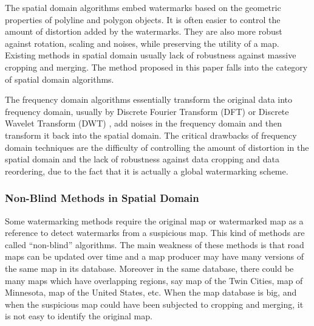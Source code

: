 The spatial domain algorithms embed watermarks based on the geometric properties of 
polyline and polygon objects. It is often easier to control the amount of distortion
added by the watermarks. They are also more robust against rotation, scaling 
and noises, while preserving the utility of a map. 
Existing methods in spatial domain usually lack of robustness against massive cropping and merging. 
The method proposed in this paper falls into the category of spatial domain algorithms. 

The frequency domain algorithms essentially transform the original data into
frequency domain, usually by Discrete Fourier Transform (DFT) 
\cite{Kitamura01:DFT,DFT,Illustration} or Discrete Wavelet Transform (DWT)
\cite{Liyuanyuan03}, add noises in the frequency domain and then transform it
back into the spatial domain.  
The critical drawbacks of frequency domain techniques are the 
difficulty of controlling the amount of distortion in the spatial domain
and the lack of robustness against data cropping and data reordering, due to
the fact that it is actually a global watermarking scheme. 

\subsubsection{Non-Blind Methods in Spatial Domain}
Some watermarking methods \cite{Han06:Adaptive,OhbuchiUE02,OhbuchiUE03} 
require the original map or watermarked map as a reference to detect watermarks 
from a suspicious map. This kind of methods are called ``non-blind'' algorithms.
The main weakness of these methods is that road maps can be updated over time
and a map producer may have many versions of the same map in its database.
Moreover in the same database, there could be many maps which have overlapping
regions, say map of the Twin Cities, map of Minnesota, map of the United States, etc.
When the map database is big, and when the suspicious map could have been
subjected to cropping and merging, it is not easy to identify the original map.

